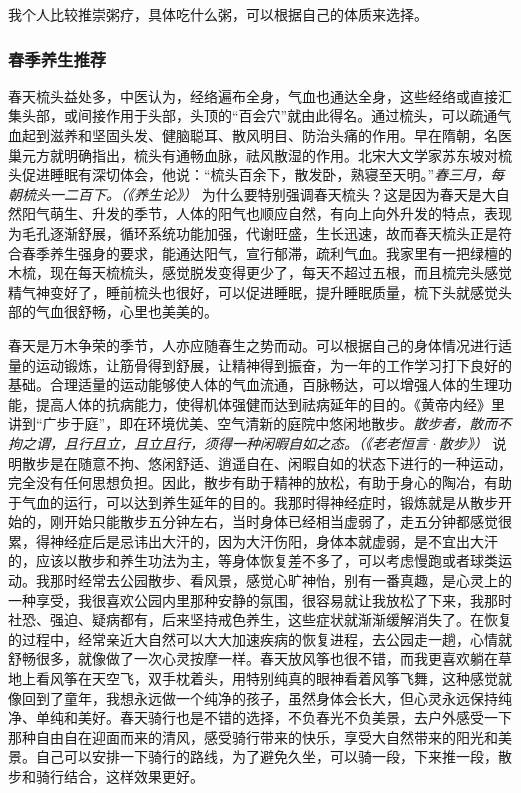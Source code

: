 我个人比较推崇粥疗，具体吃什么粥，可以根据自己的体质来选择。

\subsubsection{春季养生推荐}

春天梳头益处多，中医认为，经络遍布全身，气血也通达全身，这些经络或直接汇集头部，或间接作用于头部，头顶的“百会穴”就由此得名。通过梳头，可以疏通气血起到滋养和坚固头发、健脑聪耳、散风明目、防治头痛的作用。早在隋朝，名医巢元方就明确指出，梳头有通畅血脉，祛风散湿的作用。北宋大文学家苏东坡对梳头促进睡眠有深切体会，他说：“梳头百余下，散发卧，熟寝至天明。”\textit{春三月，每朝梳头一二百下。（《养生论》）} 为什么要特别强调春天梳头？这是因为春天是大自然阳气萌生、升发的季节，人体的阳气也顺应自然，有向上向外升发的特点，表现为毛孔逐渐舒展，循环系统功能加强，代谢旺盛，生长迅速，故而春天梳头正是符合春季养生强身的要求，能通达阳气，宣行郁滞，疏利气血。我家里有一把绿檀的木梳，现在每天梳梳头，感觉脱发变得更少了，每天不超过五根，而且梳完头感觉精气神变好了，睡前梳头也很好，可以促进睡眠，提升睡眠质量，梳下头就感觉头部的气血很舒畅，心里也美美的。

春天是万木争荣的季节，人亦应随春生之势而动。可以根据自己的身体情况进行适量的运动锻炼，让筋骨得到舒展，让精神得到振奋，为一年的工作学习打下良好的基础。合理适量的运动能够使人体的气血流通，百脉畅达，可以增强人体的生理功能，提高人体的抗病能力，使得机体强健而达到祛病延年的目的。《黄帝内经》里讲到“广步于庭”，即在环境优美、空气清新的庭院中悠闲地散步。\textit{散步者，散而不拘之谓，且行且立，且立且行，须得一种闲暇自如之态。（《老老恒言·散步》）} 说明散步是在随意不拘、悠闲舒适、逍遥自在、闲暇自如的状态下进行的一种运动，完全没有任何思想负担。因此，散步有助于精神的放松，有助于身心的陶冶，有助于气血的运行，可以达到养生延年的目的。我那时得神经症时，锻炼就是从散步开始的，刚开始只能散步五分钟左右，当时身体已经相当虚弱了，走五分钟都感觉很累，得神经症后是忌讳出大汗的，因为大汗伤阳，身体本就虚弱，是不宜出大汗的，应该以散步和养生功法为主，等身体恢复差不多了，可以考虑慢跑或者球类运动。我那时经常去公园散步、看风景，感觉心旷神怡，别有一番真趣，是心灵上的一种享受，我很喜欢公园内里那种安静的氛围，很容易就让我放松了下来，我那时社恐、强迫、疑病都有，后来坚持戒色养生，这些症状就渐渐缓解消失了。在恢复的过程中，经常亲近大自然可以大大加速疾病的恢复进程，去公园走一趟，心情就舒畅很多，就像做了一次心灵按摩一样。春天放风筝也很不错，而我更喜欢躺在草地上看风筝在天空飞，双手枕着头，用特别纯真的眼神看着风筝飞舞，这种感觉就像回到了童年，我想永远做一个纯净的孩子，虽然身体会长大，但心灵永远保持纯净、单纯和美好。春天骑行也是不错的选择，不负春光不负美景，去户外感受一下那种自由自在迎面而来的清风，感受骑行带来的快乐，享受大自然带来的阳光和美景。自己可以安排一下骑行的路线，为了避免久坐，可以骑一段，下来推一段，散步和骑行结合，这样效果更好。

